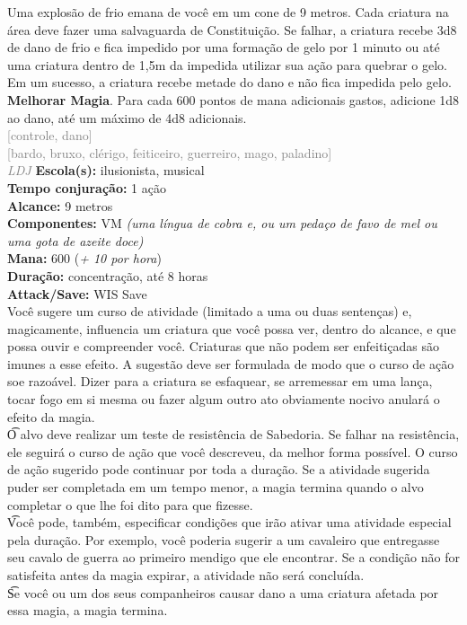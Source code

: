 \documentclass{RPG_Adventure}[2021/10/20]
\begin{document}
{\normalsize Uma explosão de frio emana de você em um cone de 9 metros. Cada criatura na área deve fazer uma salvaguarda de Constituição. Se falhar, a criatura recebe 3d8 de dano de frio e fica impedido por uma formação de gelo por 1 minuto ou até uma criatura dentro de 1,5m da impedida utilizar sua ação para quebrar o gelo. Em um sucesso, a criatura recebe metade do dano e não fica impedida pelo gelo.\\\t \textbf{Melhorar Magia}. Para cada 600 pontos de mana adicionais gastos, adicione 1d8 ao dano, até um máximo de 4d8 adicionais.\\}
{\scriptsize \textcolor{gray}{[controle, dano]\\}}
{\scriptsize \textcolor{gray}{[bardo, bruxo, clérigo, feiticeiro, guerreiro, mago, paladino]\\}}
{\tiny \textcolor{gray}{\textit{LDJ}}}
{\small \t \textbf{Escola(s):} ilusionista, musical\\\t \textbf{Tempo conjuração:} 1 ação\\\t \textbf{Alcance:} 9 metros\\\t \textbf{Componentes:} VM \textit{(uma língua de cobra e, ou um pedaço de favo de mel ou uma gota de azeite doce)}\\\t \textbf{Mana:} 600 (\textit{+ 10 por hora})\\\t \textbf{Duração:} concentração, até 8 horas\\\t \textbf{Attack/Save:} WIS Save\\}
{\normalsize Você sugere um curso de atividade (limitado a uma ou duas sentenças) e, magicamente, influencia um criatura que você possa ver, dentro do alcance, e que possa ouvir e compreender você. Criaturas que não podem ser enfeitiçadas são imunes a esse efeito. A sugestão deve ser formulada de modo que o curso de ação soe razoável. Dizer para a criatura se esfaquear, se arremessar em uma lança, tocar fogo em si mesma ou fazer algum outro ato obviamente nocivo anulará o efeito da magia.\\\t O alvo deve realizar um teste de resistência de Sabedoria. Se falhar na resistência, ele seguirá o curso de ação que você descreveu, da melhor forma possível. O curso de ação sugerido pode continuar por toda a duração. Se a atividade sugerida puder ser completada em um tempo menor, a magia termina quando o alvo completar o que lhe foi dito para que fizesse.\\\t Você pode, também, especificar condições que irão ativar uma atividade especial pela duração. Por exemplo, você poderia sugerir a um cavaleiro que entregasse seu cavalo de guerra ao primeiro mendigo que ele encontrar. Se a condição não for satisfeita antes da magia expirar, a atividade não será concluída.\\\t Se você ou um dos seus companheiros causar dano a uma criatura afetada por essa magia, a magia termina.\\}
\end{document}
